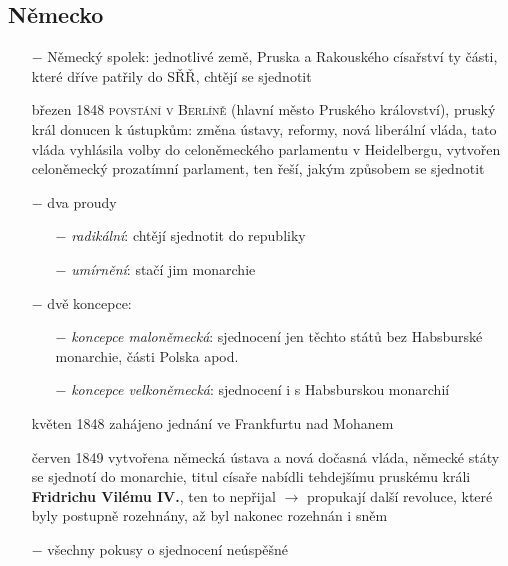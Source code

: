 \documentclass{article}
\begin{document}
\subsection*{Německo}
\begin{itemize}
    \vspace{-0.5em}
    \setlength\itemsep{0.15em}
    \item[$-$] Německý spolek: jednotlivé země, Pruska a Rakouského císařství ty části, které dříve patřily do SŘŘ, chtějí se sjednotit
    \item[březen 1848] \textsc{povstání v Berlíně} (hlavní město Pruského království), pruský král donucen k ústupkům: změna ústavy, reformy, nová liberální vláda, tato vláda vyhlásila volby do celoněmeckého parlamentu v Heidelbergu, vytvořen celoněmecký prozatímní parlament, ten řeší, jakým způsobem se sjednotit
    \item[$-$] dva proudy
    \begin{itemize}
        \vspace{-0.5em}
        \setlength\itemsep{0.15em}
        \item[$-$] \textit{radikální}: chtějí sjednotit do republiky
        \item[$-$] \textit{umírnění}: stačí jim monarchie

    \end{itemize}
    \item[$-$] dvě koncepce:
    \begin{itemize}
        \vspace{-0.5em}
        \setlength\itemsep{0.15em}
        \item[$-$] \textit{koncepce maloněmecká}: sjednocení jen těchto států bez Habsburské monarchie, části Polska apod.
        \item[$-$] \textit{koncepce velkoněmecká}: sjednocení i s Habsburskou monarchií
    \end{itemize}
    \item[květen 1848] zahájeno jednání ve Frankfurtu nad Mohanem
    \item[červen 1849] vytvořena německá ústava a nová dočasná vláda, německé státy se sjednotí do monarchie, titul císaře nabídli tehdejšímu pruskému králi \textbf{Fridrichu Vilému IV.}, ten to nepřijal $\rightarrow$ propukají další revoluce, které byly postupně rozehnány, až byl nakonec rozehnán i sněm
    \item[$-$] všechny pokusy o sjednocení neúspěšné
\end{itemize}
\end{document}
